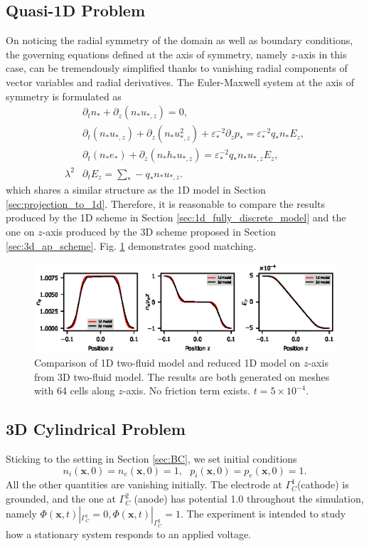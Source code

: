 \documentclass{article}
\begin{document}
\subsection{Quasi-1D Problem}
On noticing the radial symmetry of the domain as well as boundary conditions, the governing equations defined at the axis of symmetry, namely $z$-axis in this case, can be tremendously simplified thanks to vanishing radial components of vector variables and radial derivatives. The Euler-Maxwell system at the axis of symmetry is formulated as 
\begin{align*}
    &\partial_t n_* + \partial_z(n_*u_{*,z}) = 0, \\
    &\partial_t (n_* u_{*,z}) + \partial_z(n_*u_{*,z}^2) + \varepsilon_*^{-2} \partial_z p_* = \varepsilon_*^{-2}q_*n_*E_z, \\
    &\partial_t (n_*e_*) + \partial_z (n_* h_* u_{*,z}) = \varepsilon_*^{-2} q_* n_* u_{*,z} E_z, \\
    \lambda^2 &\partial_t E_z = \sum_* - q_* n_* u_{*,z}.
\end{align*}
which shares a similar structure as the 1D model in Section \ref{sec:projection_to_1d}. Therefore, it is reasonable to compare the results produced by the 1D scheme in Section \ref{sec:1d_fully_discrete_model} and the one on $z$-axis produced by the 3D scheme proposed in Section \ref{sec:3d_ap_scheme}. Fig. \ref{fig:z_axis_reduction} demonstrates good matching. 
\begin{figure}
    \centering
    \includegraphics{z_axis_reduction.eps}
    \caption{Comparison of 1D two-fluid model and reduced 1D model on $z$-axis from 3D two-fluid model. The results are both generated on meshes with 64 cells along $z$-axis. No friction term exists. $t = 5 \times 10^{-4}.$}
    \label{fig:z_axis_reduction}
\end{figure}

\subsection{3D Cylindrical Problem}
Sticking to the setting in Section \ref{sec:BC}, we set initial conditions
\begin{equation*}
    n_i(\mathbf{x}, 0) = n_e(\mathbf{x},0) = 1, \ \ \  p_i(\mathbf{x},0) = p_e(\mathbf{x},0) = 1.
\end{equation*}
All the other quantities are vanishing initially. The electrode at $\Gamma_C^1$(cathode) is grounded, and the one at $\Gamma_C^2$ (anode) has potential 1.0 throughout the simulation, namely $\Phi(\mathbf{x}, t)|_{\Gamma_C^1} = 0, \Phi(\mathbf{x}, t)|_{\Gamma_C^2} = 1$. The experiment is intended to study how a stationary system responds to an applied voltage. 
\end{document}
